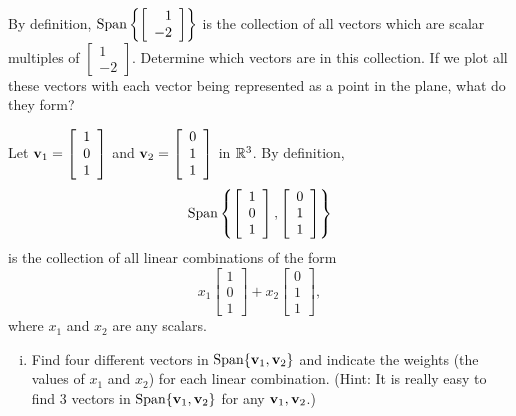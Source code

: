 \begin{activity} \label{act:A1.3_9} ~
	\ba
	\item By definition, $\text{Span}\left\{\left[ \begin{array}{r} 1 \\ -2 \end{array} \right]\right\}$ is the collection of all vectors which are scalar multiples of $\left[ \begin{array}{r} 1 \\ -2 \end{array} \right]$. Determine which vectors are in this collection. If we plot all these vectors with each vector being represented as a point in the plane, what do they form?


	\item Let $\mathbf{v}_1 = \left[ \begin{array}{c} 1 \\ 0\\ 1 \end{array} \right]$ and $\mathbf{v}_2 = \left[ \begin{array}{c} 0\\1 \\1  \end{array} \right]$ in $\mathbb{R}^3$. By definition, 
\[\text{Span}\left\{\left[ \begin{array}{c} 1 \\ 0\\ 1 \end{array} \right], \left[ \begin{array}{c} 0\\1 \\1  \end{array} \right] \right\}\]
 is the collection of all linear combinations of the form 
\[x_1 \left[ \begin{array}{c} 1 \\ 0\\ 1 \end{array} \right] + x_2 \left[ \begin{array}{c} 0\\1 \\1  \end{array} \right],\]
where $x_1$ and $x_2$ are any scalars. 
		\begin{enumerate}[i.]
		\item Find four different vectors in $\text{Span} \{\mathbf{v}_1, \mathbf{v}_2\} $ and indicate the weights (the values of $x_1$ and $x_2$) for each linear combination. (Hint: It is really easy to find 3 vectors in $\text{Span} \{\mathbf{v}_1, \mathbf{v}_2\} $ for any $\mathbf{v}_1, \mathbf{v}_2$.)


\end{enumerate}
\end{activity}
